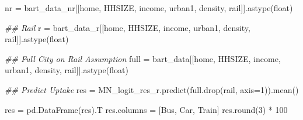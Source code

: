 \documentclass[]{tufte-book}
\newenvironment{Shaded}{}{}
\newcommand{\BuiltInTok}[1]{#1}
\newcommand{\CommentTok}[1]{\textcolor[rgb]{0.38,0.63,0.69}{\textit{#1}}}
\newcommand{\DecValTok}[1]{\textcolor[rgb]{0.25,0.63,0.44}{#1}}
\newcommand{\NormalTok}[1]{#1}
\newcommand{\OperatorTok}[1]{\textcolor[rgb]{0.40,0.40,0.40}{#1}}
\newcommand{\StringTok}[1]{\textcolor[rgb]{0.25,0.44,0.63}{#1}}
\theoremstyle{definition}
\theoremstyle{definition}
\theoremstyle{definition}
\theoremstyle{remark}
\begin{document}
\begin{Shaded}
\begin{Highlighting}[]
\NormalTok{nr }\OperatorTok{=}\NormalTok{ bart\_data\_nr[[}\StringTok{\textquotesingle{}home\textquotesingle{}}\NormalTok{, }\StringTok{\textquotesingle{}HHSIZE\textquotesingle{}}\NormalTok{, }\StringTok{\textquotesingle{}income\textquotesingle{}}\NormalTok{, }\StringTok{\textquotesingle{}urban1\textquotesingle{}}\NormalTok{, }\StringTok{\textquotesingle{}density\textquotesingle{}}\NormalTok{, }\StringTok{\textquotesingle{}rail\textquotesingle{}}\NormalTok{]].astype(}\BuiltInTok{float}\NormalTok{)}

\CommentTok{\#\# Rail}
\NormalTok{r }\OperatorTok{=}\NormalTok{ bart\_data\_r[[}\StringTok{\textquotesingle{}home\textquotesingle{}}\NormalTok{, }\StringTok{\textquotesingle{}HHSIZE\textquotesingle{}}\NormalTok{, }\StringTok{\textquotesingle{}income\textquotesingle{}}\NormalTok{, }\StringTok{\textquotesingle{}urban1\textquotesingle{}}\NormalTok{, }\StringTok{\textquotesingle{}density\textquotesingle{}}\NormalTok{, }\StringTok{\textquotesingle{}rail\textquotesingle{}}\NormalTok{]].astype(}\BuiltInTok{float}\NormalTok{)}

\CommentTok{\#\# Full City on Rail Assumption}
\NormalTok{full }\OperatorTok{=}\NormalTok{ bart\_data[[}\StringTok{\textquotesingle{}home\textquotesingle{}}\NormalTok{, }\StringTok{\textquotesingle{}HHSIZE\textquotesingle{}}\NormalTok{, }\StringTok{\textquotesingle{}income\textquotesingle{}}\NormalTok{, }\StringTok{\textquotesingle{}urban1\textquotesingle{}}\NormalTok{, }\StringTok{\textquotesingle{}density\textquotesingle{}}\NormalTok{, }\StringTok{\textquotesingle{}rail\textquotesingle{}}\NormalTok{]].astype(}\BuiltInTok{float}\NormalTok{)}

\CommentTok{\#\# Predict Uptake}
\NormalTok{res }\OperatorTok{=}\NormalTok{ MN\_logit\_res\_r.predict(full.drop(}\StringTok{\textquotesingle{}rail\textquotesingle{}}\NormalTok{, axis}\OperatorTok{=}\DecValTok{1}\NormalTok{)).mean()}

\NormalTok{res }\OperatorTok{=}\NormalTok{ pd.DataFrame(res).T}
\NormalTok{res.columns }\OperatorTok{=}\NormalTok{ [}\StringTok{\textquotesingle{}Bus\textquotesingle{}}\NormalTok{, }\StringTok{\textquotesingle{}Car\textquotesingle{}}\NormalTok{, }\StringTok{\textquotesingle{}Train\textquotesingle{}}\NormalTok{]}
\NormalTok{res.}\BuiltInTok{round}\NormalTok{(}\DecValTok{3}\NormalTok{) }\OperatorTok{*} \DecValTok{100}
\end{Highlighting}
\end{Shaded}
\end{document}
